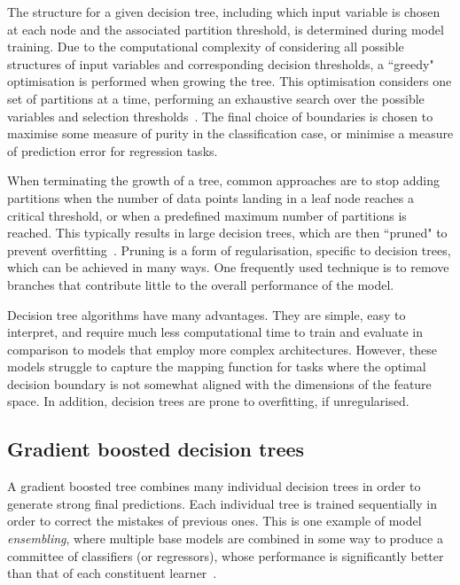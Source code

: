 The structure for a given decision tree, including which input variable is chosen at each node and the associated partition threshold, is determined during model training. Due to the computational complexity of considering all possible structures of input variables and corresponding decision thresholds, a ``greedy" optimisation is performed when growing the tree. This optimisation considers one set of partitions at a time, performing an exhaustive search over the possible variables and selection thresholds~\cite{patternRecognitionAndML}. The final choice of boundaries is chosen to maximise some measure of purity in the classification case, or minimise a measure of prediction error for regression tasks. %

When terminating the growth of a tree, common approaches are to stop adding partitions when the number of data points landing in a leaf node reaches a critical threshold, or when a predefined maximum number of partitions is reached. This typically results in large decision trees, which are then ``pruned" to prevent overfitting~\cite{patternRecognitionAndML}. Pruning is a form of regularisation, specific to decision trees, which can be achieved in many ways. One frequently used technique is to remove branches that contribute little to the overall performance of the model.

Decision tree algorithms have many advantages. They are simple, easy to interpret, and require much less computational time to train and evaluate in comparison to models that employ more complex architectures. However, these models struggle to capture the mapping function for tasks where the optimal decision boundary is not somewhat aligned with the dimensions of the feature space. In addition, decision trees are prone to overfitting, if unregularised.

\subsection{Gradient boosted decision trees} 

A gradient boosted tree combines many individual decision trees in order to generate strong final predictions. 
Each individual tree is trained sequentially in order to correct the mistakes of previous ones.
This is one example of model \textit{ensembling}, where multiple base models are combined in some way to produce a committee of classifiers (or regressors), whose performance is significantly better than that of each constituent learner~\cite{weak_learners,patternRecognitionAndML}. 


